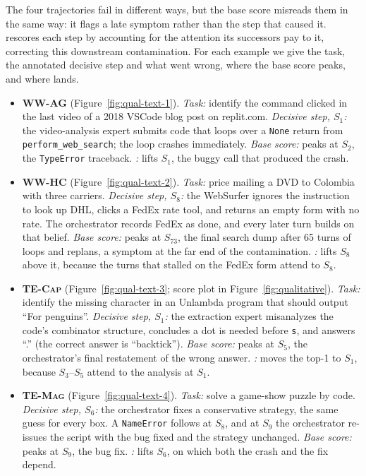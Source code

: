 The four trajectories fail in different ways, but the base score misreads them in the same way: it flags a late symptom rather than the step that caused it. \soap{} rescores each step by accounting for the attention its successors pay to it, correcting this downstream contamination. For each example we give the task, the annotated decisive step and what went wrong, where the base score peaks, and where \soap{} lands.
\begin{itemize}
    \item \textbf{\textsc{WW-AG}} (Figure~\ref{fig:qual-text-1}). \emph{Task:} identify the command clicked in the last video of a 2018 VSCode blog post on replit.com. \emph{Decisive step, $S_1$:} the video-analysis expert submits code that loops over a \texttt{None} return from \texttt{perform\_web\_search}; the loop crashes immediately. \emph{Base score:} peaks at $S_2$, the \texttt{TypeError} traceback. \emph{\soap{}:} lifts $S_1$, the buggy call that produced the crash.

    \item \textbf{\textsc{WW-HC}} (Figure~\ref{fig:qual-text-2}). \emph{Task:} price mailing a DVD to Colombia with three carriers. \emph{Decisive step, $S_8$:} the WebSurfer ignores the instruction to look up DHL, clicks a FedEx rate tool, and returns an empty form with no rate. The orchestrator records FedEx as done, and every later turn builds on that belief. \emph{Base score:} peaks at $S_{73}$, the final search dump after 65 turns of loops and replans, a symptom at the far end of the contamination. \emph{\soap{}:} lifts $S_8$ above it, because the turns that stalled on the FedEx form attend to $S_8$.

    \item \textbf{\textsc{TE-Cap}} (Figure~\ref{fig:qual-text-3}; score plot in Figure~\ref{fig:qualitative}). \emph{Task:} identify the missing character in an Unlambda program that should output ``For penguins''. \emph{Decisive step, $S_1$:} the extraction expert misanalyzes the code's combinator structure, concludes a dot is needed before \texttt{s}, and answers ``.'' (the correct answer is ``backtick''). \emph{Base score:} peaks at $S_5$, the orchestrator's final restatement of the wrong answer. \emph{\soap{}:} moves the top-1 to $S_1$, because $S_3$--$S_5$ attend to the analysis at $S_1$.

    \item \textbf{\textsc{TE-Mag}} (Figure~\ref{fig:qual-text-4}). \emph{Task:} solve a game-show puzzle by code. \emph{Decisive step, $S_6$:} the orchestrator fixes a conservative strategy, the same guess for every box. A \texttt{NameError} follows at $S_8$, and at $S_9$ the orchestrator re-issues the script with the bug fixed and the strategy unchanged. \emph{Base score:} peaks at $S_9$, the bug fix. \emph{\soap{}:} lifts $S_6$, on which both the crash and the fix depend.
\end{itemize}

